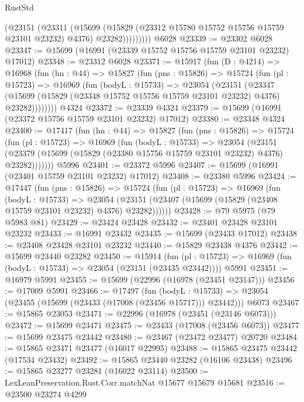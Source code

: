 \begin{lexlean}{RustStd}
\begin{coremodule}
                (@23151
                  (@23311
                    (@15699
                      (@15829 (@23312 @15780 @15752 @15756 @15759 @23101 @23232) @4376)
                      @23282)))))))))
    @6028
@23339 := @23302 @6028
@23347 := @15699 (@16991 (@23339 @15752 @15756 @15759 @23101 @23232) @17012)
@23348 := @23312 @6028
@23371 := @15917
    (fun (D : @4214) =>
    @16968
      (fun (hn : @44) =>
      @15827
        (fun (pns : @15826) =>
        @15724
          (fun (pl : @15723) =>
          @16969
            (fun (bodyL : @15733) =>
            @23054
              (@23151
                (@23347
                  (@15699 (@15829 (@23348 @15752 @15756 @15759 @23101 @23232) @4376) @23282))))))))
    @4324
@23372 := @23339 @4324
@23379 := @15699 (@16991 (@23372 @15756 @15759 @23101 @23232) @17012)
@23380 := @23348 @4324
@23400 := @17417
    (fun (hn : @44) =>
    @15827
      (fun (pns : @15826) =>
      @15724
        (fun (pl : @15723) =>
        @16969
          (fun (bodyL : @15733) =>
          @23054
            (@23151
              (@23379 (@15699 (@15829 (@23380 @15756 @15759 @23101 @23232) @4376) @23282)))))))
    @5996
@23401 := @23372 @5996
@23407 := @15699 (@16991 (@23401 @15759 @23101 @23232) @17012)
@23408 := @23380 @5996
@23424 := @17447
    (fun (pns : @15826) =>
    @15724
      (fun (pl : @15723) =>
      @16969
        (fun (bodyL : @15733) =>
        @23054 (@23151 (@23407 (@15699 (@15829 (@23408 @15759 @23101 @23232) @4376) @23282))))))
@23428 := @79 @5975 (@79 @5983 @81)
@23429 := @23424 @23428
@23432 := @23401 @23428 @23101 @23232
@23433 := @16991 @23432
@23435 := @15699 (@23433 @17012)
@23438 := @23408 @23428 @23101 @23232
@23440 := @15829 @23438 @4376
@23442 := @15699 @23440 @23282
@23450 := @15914
    (fun (pl : @15723) => @16969 (fun (bodyL : @15733) => @23054 (@23151 (@23435 @23442))))
    @5991
@23451 := @16979 @5991
@23455 := @15699 (@22996 (@16978 (@23451 @23147)))
@23456 := @17009 @5991
@23466 := @17497
    (fun (bodyL : @15733) => @23054 (@23455 (@15699 (@23433 (@17008 (@23456 @15717))) @23442)))
    @6073
@23467 := @15865 @23053
@23471 := @22996 (@16978 (@23451 (@23146 @6073)))
@23472 := @15699 @23471
@23475 := @23433 (@17008 (@23456 @6073))
@23477 := @15699 @23475 @23442
@23480 := @23467 (@23472 @23477) @20720
@23484 := @15865 @23471 @23477 (@16017 @22995)
@23488 := @15865 @23475 @23442 (@17534 @23432)
@23492 := @15865 @23440 @23282 (@16106 @23438)
@23496 := @15865 @23277 @23281 (@16022 @23114)
@23500 := LexLeanPreservation.Rust.Corr.matchNat @15677 @15679 @15681
@23516 := @23500
    @23274
    @4299

\end{coremodule}
\end{lexlean}
